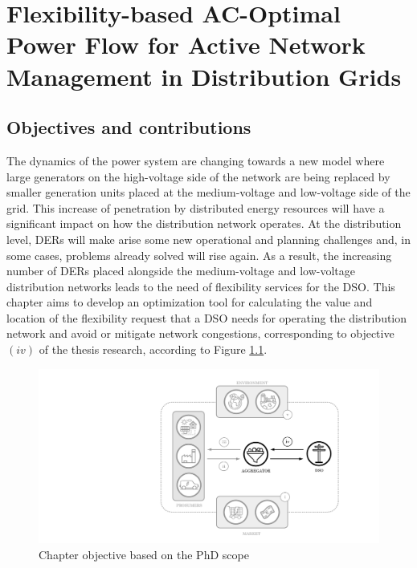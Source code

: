 \chapter{Flexibility-based AC-Optimal Power Flow for Active Network Management in Distribution Grids}
\label{ChapterOPFDSO}

\section{Objectives and contributions}

The dynamics of the power system are changing towards a new model where large generators on the high-voltage side of the network are being replaced by smaller generation units placed at the medium-voltage and low-voltage side of the grid. This increase of penetration by distributed energy resources will have a significant impact on how the distribution network operates. At the distribution level, DERs will make arise some new operational and planning challenges and, in some cases, problems already solved will rise again. As a result, the increasing number of DERs placed alongside the medium-voltage  and low-voltage distribution networks leads to the need of flexibility services for the DSO. 
This chapter aims to develop an optimization tool for calculating the value and location of the flexibility request that a DSO needs for operating the distribution network and avoid or mitigate network congestions, corresponding to objective $(iv)$ of the thesis research, according to Figure \ref{fig:chapter_obj_iv}. 

\begin{figure}[htbp]
	\centering
	\includegraphics[width=0.7\columnwidth ]{ChapterOPF_DSO/Figures/phd_intro_iv.pdf}
		\caption{Chapter objective based on the PhD scope}
	\label{fig:chapter_obj_iv}  
\end{figure}

